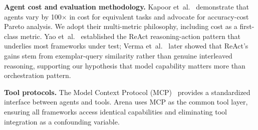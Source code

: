 \documentclass[sigconf]{acmart}
\begin{document}
\textbf{Agent cost and evaluation methodology.} Kapoor et~al.~\cite{kapoor} demonstrate that agents vary by 100$\times$ in cost for equivalent tasks and advocate for accuracy-cost Pareto analysis. We adopt their multi-metric philosophy, including cost as a first-class metric. Yao et~al.~\cite{react} established the ReAct reasoning-action pattern that underlies most frameworks under test; Verma et~al.~\cite{verma} later showed that ReAct's gains stem from exemplar-query similarity rather than genuine interleaved reasoning, supporting our hypothesis that model capability matters more than orchestration pattern.

\textbf{Tool protocols.} The Model Context Protocol (MCP)~\cite{mcp} provides a standardized interface between agents and tools. Arena uses MCP as the common tool layer, ensuring all frameworks access identical capabilities and eliminating tool integration as a confounding variable.
\end{document}
